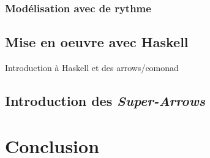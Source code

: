 \documentclass{llncs}
\newcommand{\SAs}{\emph{Super-Arrows}}
\begin{document}
\subsubsection{Modélisation avec de rythme}
\subsection{Mise en oeuvre avec Haskell}
Introduction à Haskell et des arrows/comonad
\subsection{Introduction des \SAs}

\section{Conclusion}





\end{document}
